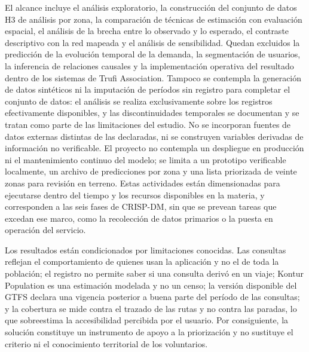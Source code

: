 El alcance incluye el análisis exploratorio, la construcción del conjunto de datos H3 de análisis por
zona, la comparación de técnicas de estimación con evaluación espacial, el análisis de la
brecha entre lo observado y lo esperado, el contraste descriptivo con la red mapeada y el
análisis de sensibilidad. Quedan excluidos la predicción de la evolución temporal de la
demanda, la segmentación de usuarios, la inferencia de relaciones causales y la
implementación operativa del resultado dentro de los sistemas de Trufi Association.
Tampoco se contempla la generación de datos sintéticos ni la imputación de períodos sin
registro para completar el conjunto de datos: el análisis se realiza exclusivamente sobre
los registros efectivamente disponibles, y las discontinuidades temporales se documentan y
se tratan como parte de las limitaciones del estudio. No se incorporan fuentes de datos
externas distintas de las declaradas, ni se construyen variables derivadas de información
no verificable. El proyecto no contempla un despliegue en producción ni el mantenimiento
continuo del modelo; se limita a un prototipo verificable localmente, un archivo de
predicciones por zona y una lista priorizada de veinte zonas para revisión en terreno.
Estas actividades están dimensionadas para ejecutarse dentro del tiempo y los recursos
disponibles en la materia, y corresponden a las seis fases de CRISP-DM, sin que se prevean
tareas que excedan ese marco, como la recolección de datos primarios o la puesta en
operación del servicio.

Los resultados están condicionados por limitaciones conocidas. Las consultas reflejan el
comportamiento de quienes usan la aplicación y no el de toda la población; el registro no
permite saber si una consulta derivó en un viaje; Kontur Population es una estimación
modelada y no un censo; la versión disponible del GTFS declara una vigencia posterior a
buena parte del período de las consultas; y la cobertura se mide contra el trazado de las
rutas y no contra las paradas, lo que sobreestima la accesibilidad percibida por el
usuario. Por consiguiente, la solución constituye un instrumento de apoyo a la
priorización y no sustituye el criterio ni el conocimiento territorial de los voluntarios.
